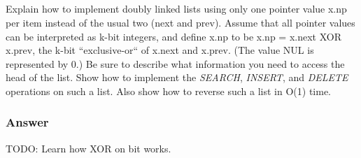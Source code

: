     \subsection{}

    Explain how to implement doubly linked lists using only one pointer value
    x.np per item instead of the usual two (next and prev). Assume that all
    pointer values can be interpreted as k-bit integers, and define x.np to be
    x.np = x.next XOR x.prev, the k-bit ``exclusive-or`` of x.next and x.prev.
    (The value NUL is represented by 0.) Be sure to describe what information
    you need to access the head of the list. Show how to implement the
    \textit{SEARCH}, \textit{INSERT}, and \textit{DELETE} operations on such a
    list. Also show how to reverse such a list in O(1) time.

    \subsubsection{Answer}

    TODO: Learn how XOR on bit works.
